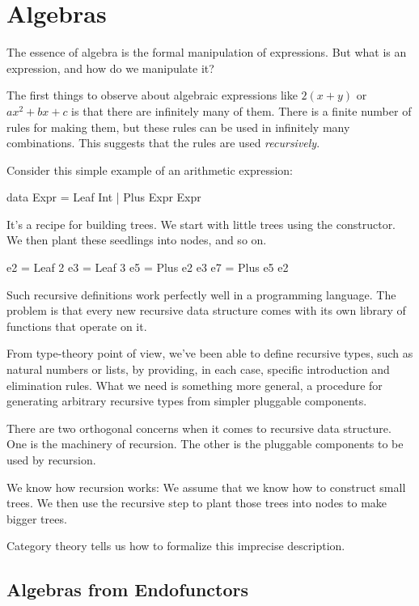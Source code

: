 \documentclass[DaoFP]{subfiles}
\begin{document}
\setcounter{chapter}{10}

\chapter{Algebras}

The essence of algebra is the formal manipulation of expressions. But what is an expression, and how do we manipulate it?

The first things to observe about algebraic expressions like $2 (x + y)$ or $a x^2 + b x + c$ is that there are infinitely many of them. There is a finite number of rules for making them, but these rules can be used in infinitely many combinations. This suggests that the rules are used \emph{recursively}. 



Consider this simple example of an arithmetic expression:
\begin{haskell}
data Expr = Leaf Int | Plus Expr Expr
\end{haskell}
It's a recipe for building trees. We start with little trees using the  constructor. We then plant these seedlings into nodes, and so on.
\begin{haskell}
e2 = Leaf 2
e3 = Leaf 3
e5 = Plus e2 e3
e7 = Plus e5 e2
\end{haskell}

Such recursive definitions work perfectly well in a programming language. The problem is that every new recursive data structure comes with its own library of functions that operate on it.

From type-theory point of view, we've been able to define recursive types, such as natural numbers or lists, by providing, in each case, specific introduction and elimination rules. What we need is something more general, a procedure for generating arbitrary recursive types from simpler pluggable components. 

There are two orthogonal concerns when it comes to recursive data structure. One is the machinery of recursion. The other is the pluggable components to be used by recursion. 

We know how recursion works: We assume that we know how to construct small trees. We then use the recursive step to plant those trees into nodes to make bigger trees. 

Category theory tells us how to formalize this imprecise description.

\section{Algebras from Endofunctors}
\end{document}
